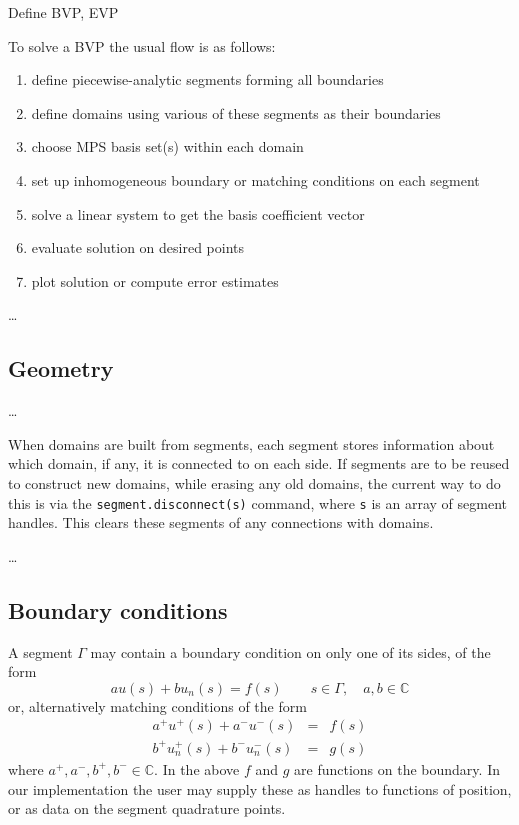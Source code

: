 \documentclass[12pt]{article}
\newcommand{\ben}{\begin{enumerate}}
\newcommand{\een}{\end{enumerate}}
\newcommand{\bea}{\begin{eqnarray}}
\newcommand{\eea}{\end{eqnarray}}
\begin{document}
Define BVP, EVP

To solve a BVP the usual flow is as follows:

\ben
\item define piecewise-analytic segments forming all boundaries
\item define domains using various of these segments as their boundaries
\item choose MPS basis set(s) within each domain
\item set up inhomogeneous boundary or matching conditions on each segment
\item solve a %
linear system to get the basis coefficient vector
\item evaluate solution on desired points
\item plot solution or compute error estimates
\een

\ldots

\subsection{Geometry}

\ldots

When domains are built from segments, each segment stores information about
which domain, if any, it is connected to on each side.
If segments are to be reused to construct new domains, while erasing any
old domains, the current way to do this is via the {\tt segment.disconnect(s)}
command, where {\tt s} is an array of segment handles. This clears
these segments of any connections with domains.

\ldots

\subsection{Boundary conditions}

A segment $\Gamma$ may contain a boundary condition on only one of its sides,
of the form
$$
a u(s) + b u_n(s) = f(s)  \qquad s\in\Gamma, \quad a,b \in \mathbb{C}
$$
or, alternatively matching conditions of the form
\bea
a^+ u^+(s) + a^- u^-(s) &=& f(s)\\
b^+ u_n^+(s) + b^- u_n^-(s) &=& g(s)
\eea
where $a^+,a^-,b^+,b^- \in \mathbb{C}$.
In the above $f$ and $g$ are functions on the boundary.
In our implementation the user
may supply these as handles to functions of position, or as data on the segment
quadrature points.
\end{document}
